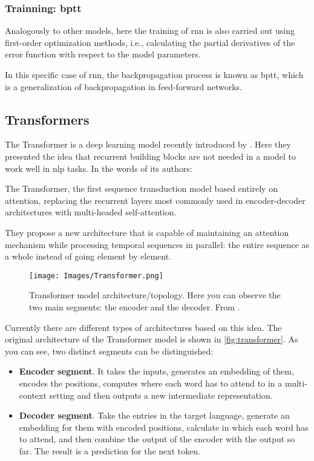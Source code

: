 \subsubsection{Trainning: \acl*{bptt}}

Analogously to other models, here the training of \gls{rnn} is also carried out
using first-order optimization methods, i.e., calculating the partial
derivatives of the error function with respect to the model parameters.

In this specific case of \gls{rnn}, the backpropagation process is known as
\gls{bptt}, which is a generalization of backpropagation in feed-forward
networks.


\subsection{Transformers}\label{sec:transformers}

The Transformer is a deep learning model recently introduced by
. Here they presented the idea that
recurrent building blocks are not needed in a model to work well in \gls{nlp}
tasks. In the words of its authors:

\begin{quoteBox}
  The Transformer, the first sequence transduction model based entirely
  on attention, replacing the recurrent layers most commonly used in
  encoder-decoder architectures with multi-headed self-attention.
  \tcblower{}
\end{quoteBox}

They propose a new architecture that is capable of maintaining an attention
mechanism while processing temporal sequences in parallel: the entire sequence
as a whole instead of going element by element.

\begin{figure}[p]
  \centering
  \texttt{[image: Images/Transformer.png]}
  \caption[Transformer model architecture]{Transformer model
    architecture/topology. Here you can observe the two main segments: the
    encoder and the decoder. From
    .}\label{fig:transformer}
\end{figure}

Currently there are different types of architectures based on this idea. The
original architecture of the Transformer model is shown in
\vref{fig:transformer}. As you can see, two distinct segments can be
distinguished:
\begin{itemize}
  \item \textbf{Encoder segment}. It takes the inputs, generates an embedding
  of them, encodes the positions, computes where each word has to attend to in
  a multi-context setting and then outputs a new intermediate representation.
  \item \textbf{Decoder segment}. Take the entries in the target language,
  generate an embedding for them with encoded positions, calculate in which
  each word has to attend, and then combine the output of the encoder with the
  output so far. The result is a prediction for the next token.
\end{itemize}


